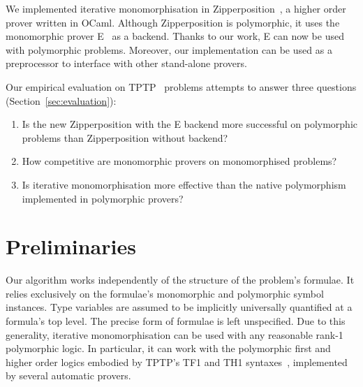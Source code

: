 \documentclass[runningheads]{llncs}
\begin{document}
We implemented iterative monomorphisation in Zipperposition~\cite{zipp}, a higher order prover written in OCaml. Although Zipperposition is polymorphic, it uses the monomorphic prover E~\cite{e} as a backend. Thanks to our work, E can now be used with polymorphic problems. Moreover, our implementation can be used as a preprocessor to interface with other stand-alone provers.

Our empirical evaluation on TPTP~\cite{tptp} problems attempts to answer three questions (Section~\ref{sec:evaluation}):
\begin{enumerate}
\item Is the new Zipperposition with the E backend more successful on polymorphic problems than Zipperposition without backend?

\smallskip

\item How competitive are monomorphic provers on monomorphised %
problems?

\smallskip

\item Is iterative monomorphisation more effective than the native polymorphism implemented in polymorphic provers?
\end{enumerate}

%
%
%
%

\section{Preliminaries}
\label{sec:preliminaries}

Our algorithm works independently of the structure of the problem's formulae. It relies exclusively on the formulae's monomorphic and polymorphic symbol instances. Type variables are assumed to be implicitly universally quantified at a formula's top level. The precise form of formulae is left unspecified.
Due to this generality, iterative monomorphisation can be used with any reasonable rank-1 polymorphic logic. In particular, it can work with the polymorphic first and higher order logics embodied by TPTP's TF1 and TH1 syntaxes~\cite{blanchette-paskevich-2013,th1}, implemented by several automatic provers.
\end{document}
